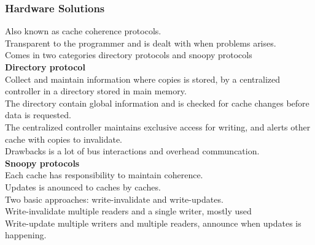 \documentclass[12pt, a4paper]{article}
\begin{document}
			\subsubsection{Hardware Solutions}
				Also known as cache coherence protocols.\\
				Transparent to the programmer and is dealt with when problems arises.\\
				Comes in two categories directory protocols and snoopy protocols\\
				\textbf{Directory protocol }\\
				Collect and maintain information where copies is stored, by a centralized controller in a directory stored in main memory.\\
				The directory contain global information and is checked for cache changes before data is requested.\\
				The centralized controller maintains exclusive access for writing, and alerts other cache with copies to invalidate.\\
				Drawbacks is a lot of bus interactions and overhead communcation.\\
				\textbf{Snoopy protocols}\\
				Each cache has responsibility to maintain coherence.\\
				Updates is anounced to caches by caches.\\
				Two basic approaches: write-invalidate and write-updates.\\
				Write-invalidate multiple readers and a single writer, mostly used\\
				Write-update multiple writers and multiple readers, announce when updates is happening.\\
\end{document}
